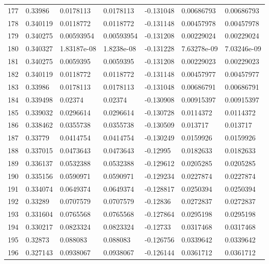 \begin{longtable}{l|lll|lll}
 177 &  0.33986     & 0.0178113   & 0.0178113   & -0.131048    & 0.00686793  & 0.00686793  \\
 178 &  0.340119    & 0.0118772   & 0.0118772   & -0.131148    & 0.00457978  & 0.00457978  \\
 179 &  0.340275    & 0.00593954  & 0.00593954  & -0.131208    & 0.00229024  & 0.00229024  \\
 180 &  0.340327    & 1.83187e-08 & 1.8238e-08  & -0.131228    & 7.63278e-09 & 7.03246e-09 \\
 181 &  0.340275    & 0.0059395   & 0.0059395   & -0.131208    & 0.00229023  & 0.00229023  \\
 182 &  0.340119    & 0.0118772   & 0.0118772   & -0.131148    & 0.00457977  & 0.00457977  \\
 183 &  0.33986     & 0.0178113   & 0.0178113   & -0.131048    & 0.00686791  & 0.00686791  \\
 184 &  0.339498    & 0.02374     & 0.02374     & -0.130908    & 0.00915397  & 0.00915397  \\
 185 &  0.339032    & 0.0296614   & 0.0296614   & -0.130728    & 0.0114372   & 0.0114372   \\
 186 &  0.338462    & 0.0355738   & 0.0355738   & -0.130509    & 0.013717    & 0.013717    \\
 187 &  0.33779     & 0.0414754   & 0.0414754   & -0.130249    & 0.0159926   & 0.0159926   \\
 188 &  0.337015    & 0.0473643   & 0.0473643   & -0.12995     & 0.0182633   & 0.0182633   \\
 189 &  0.336137    & 0.0532388   & 0.0532388   & -0.129612    & 0.0205285   & 0.0205285   \\
 190 &  0.335156    & 0.0590971   & 0.0590971   & -0.129234    & 0.0227874   & 0.0227874   \\
 191 &  0.334074    & 0.0649374   & 0.0649374   & -0.128817    & 0.0250394   & 0.0250394   \\
 192 &  0.33289     & 0.0707579   & 0.0707579   & -0.12836     & 0.0272837   & 0.0272837   \\
 193 &  0.331604    & 0.0765568   & 0.0765568   & -0.127864    & 0.0295198   & 0.0295198   \\
 194 &  0.330217    & 0.0823324   & 0.0823324   & -0.12733     & 0.0317468   & 0.0317468   \\
 195 &  0.32873     & 0.088083    & 0.088083    & -0.126756    & 0.0339642   & 0.0339642   \\
 196 &  0.327143    & 0.0938067   & 0.0938067   & -0.126144    & 0.0361712   & 0.0361712   \\

\end{longtable}
